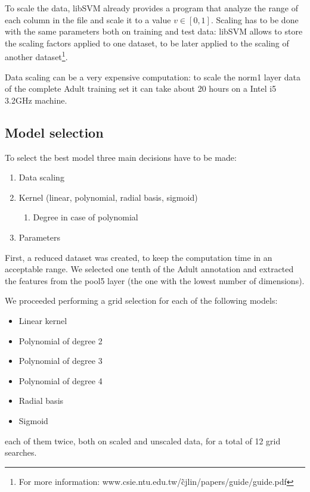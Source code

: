 To scale the data, libSVM already provides a program that analyze the range of
each column in the file and scale it to a value $v \in [0, 1]$. Scaling has to
be done with the same parameters both on training and test data: libSVM allows
to store the scaling factors applied to one dataset, to be later applied to the
scaling of another dataset\footnote{For more information:
www.csie.ntu.edu.tw/\~cjlin/papers/guide/guide.pdf}.

Data scaling can be a very expensive computation: to scale the norm1 layer data
of the complete Adult training set it can take about 20 hours on a Intel i5
3.2GHz machine.

\subsection{Model selection}

To select the best model three main decisions have to be made:

\begin{enumerate}\itemsep0.5pt
    \item Data scaling
    \item Kernel (linear, polynomial, radial basis, sigmoid)
    \begin{enumerate}\itemsep0.5pt
        \item[2.1] Degree in case of polynomial
    \end{enumerate}
    \item Parameters
\end{enumerate}

First, a reduced dataset was created, to keep the computation time in an
acceptable range. We selected one tenth of the Adult annotation and extracted
the features from the pool5 layer (the one with the lowest number of dimensions).

We proceeded performing a grid selection for each of the following models:
\begin{itemize}\itemsep0.5pt
    \item Linear kernel
    \item Polynomial of degree 2
    \item Polynomial of degree 3
    \item Polynomial of degree 4
    \item Radial basis
    \item Sigmoid
\end{itemize}
each of them twice, both on scaled and unscaled data, for a total of 12 grid searches.

